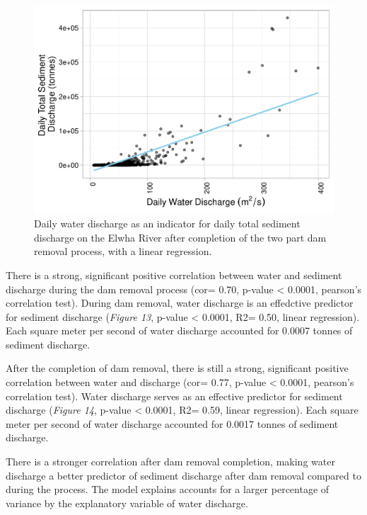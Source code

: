\documentclass[12pt,]{article}
\begin{document}
\begin{figure}
\centering
\includegraphics{Mason_ENV872_ProjectFinal_files/figure-latex/Linear After (Figure 14)-1.pdf}
\caption{Daily water discharge as an indicator for daily total sediment
discharge on the Elwha River after completion of the two part dam
removal process, with a linear regression.}
\end{figure}

There is a strong, significant positive correlation between water and
sediment discharge during the dam removal process (cor= 0.70, p-value
\textless{} 0.0001, pearson's correlation test). During dam removal,
water discharge is an effedctive predictor for sediment discharge
(\emph{Figure 13}, p-value \textless{} 0.0001, R2= 0.50, linear
regression). Each square meter per second of water discharge accounted
for 0.0007 tonnes of sediment discharge.

After the completion of dam removal, there is still a strong,
significant positive correlation between water and discharge (cor= 0.77,
p-value \textless{} 0.0001, pearson's correlation test). Water discharge
serves as an effective predictor for sediment discharge (\emph{Figure
14}, p-value \textless{} 0.0001, R2= 0.59, linear regression). Each
square meter per second of water discharge accounted for 0.0017 tonnes
of sediment discharge.

There is a stronger correlation after dam removal completion, making
water discharge a better predictor of sediment discharge after dam
removal compared to during the process. The model explains accounts for
a larger percentage of variance by the explanatory variable of water
discharge.
\end{document}
